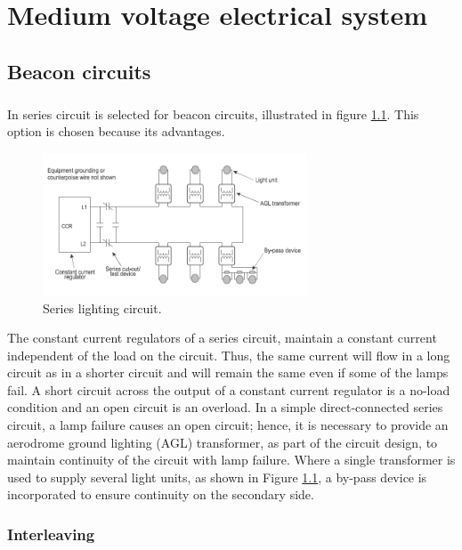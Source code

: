 \chapter{Medium voltage electrical system}

	\section{Beacon circuits}
	\paragraph{} In series circuit is selected for beacon circuits, illustrated in figure \ref{series}. This option is chosen because its advantages.
	\begin{figure}[H]
		\centering
		\includegraphics[clip, trim=0cm 0cm 0cm 0cm, width=0.7\textwidth]{./images/electric/series}
		\caption{Series lighting circuit.}
		\label{series}
	\end{figure}

	The constant current regulators of a series circuit, maintain a constant current independent of the load on the circuit. Thus, the same current will flow in a long circuit as in a shorter circuit and will remain the same even if some of the lamps fail. A short circuit across the output of a constant current regulator is a no-load condition and an open circuit is an overload. In a simple direct-connected series circuit, a lamp failure causes an open circuit; hence, it is necessary to provide an aerodrome ground lighting (AGL) transformer, as part of the circuit design, to maintain continuity of the circuit with lamp failure. Where a single transformer is used to supply several light units, as shown in Figure \ref{series}, a by-pass device is incorporated to ensure continuity on the secondary side.
	
	\subsection{Interleaving}
